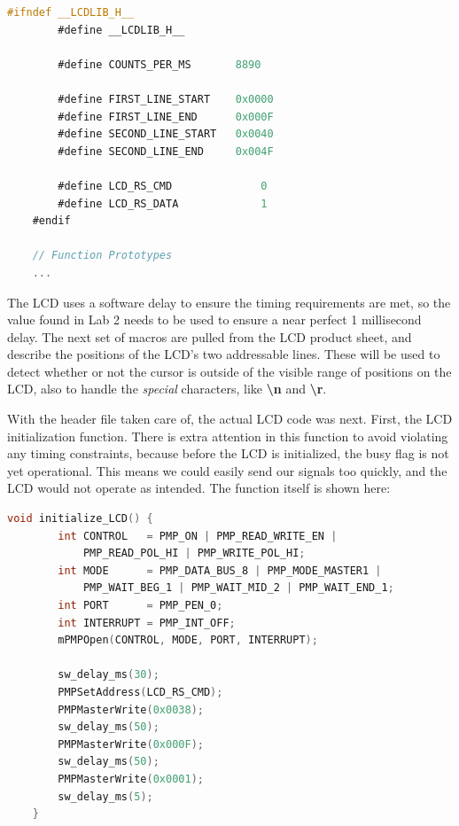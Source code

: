 \documentclass[a4paper, 12pt]{article}
\begin{document}
	\begin{mdframed}[backgroundcolor=code-gray, roundcorner=10pt,
								innerleftmargin=5, innertopmargin=5, innerbottommargin=5]	
	\begin{lstlisting}[language=C, caption=LCD Library Header File, tabsize=2]
	#ifndef __LCDLIB_H__
		#define __LCDLIB_H__

		#define COUNTS_PER_MS   	8890

		#define FIRST_LINE_START	0x0000
		#define FIRST_LINE_END		0x000F
		#define SECOND_LINE_START	0x0040
		#define SECOND_LINE_END		0x004F

		#define LCD_RS_CMD				0
		#define LCD_RS_DATA				1
	#endif

	// Function Prototypes
	...
	\end{lstlisting}
	\end{mdframed}
	
The LCD uses a software delay to ensure the timing requirements are met, so the value found in Lab 2 needs to be used to ensure a near perfect 1 millisecond delay. The next set of macros are pulled from the LCD product sheet, and describe the positions of the LCD's two addressable lines. These will be used to detect whether or not the cursor is outside of the visible range of positions on the LCD, also to handle the \textit{special} characters, like \textbf{\textbackslash n} and \textbf{\textbackslash r}.

With the header file taken care of, the actual LCD code was next. First, the LCD initialization function. There is extra attention in this function to avoid violating any timing constraints, because before the LCD is initialized, the busy flag is not yet operational. This means we could easily send our signals too quickly, and the LCD would not operate as intended. The function itself is shown here:

	\begin{mdframed}[backgroundcolor=code-gray, roundcorner=10pt,
								innerleftmargin=5, innertopmargin=5, innerbottommargin=5]	
	\begin{lstlisting}[language=C, caption=LCD Initialization, tabsize=2]
	void initialize_LCD() {
		int CONTROL   = PMP_ON | PMP_READ_WRITE_EN |
			PMP_READ_POL_HI | PMP_WRITE_POL_HI;
		int MODE      = PMP_DATA_BUS_8 | PMP_MODE_MASTER1 |
			PMP_WAIT_BEG_1 | PMP_WAIT_MID_2 | PMP_WAIT_END_1;
		int PORT      = PMP_PEN_0;
		int INTERRUPT = PMP_INT_OFF;
		mPMPOpen(CONTROL, MODE, PORT, INTERRUPT);
	
		sw_delay_ms(30);
		PMPSetAddress(LCD_RS_CMD);
		PMPMasterWrite(0x0038);
		sw_delay_ms(50);
		PMPMasterWrite(0x000F);
		sw_delay_ms(50);
		PMPMasterWrite(0x0001);
		sw_delay_ms(5);
	}
	\end{lstlisting}
	\end{mdframed}
	
\end{document}
